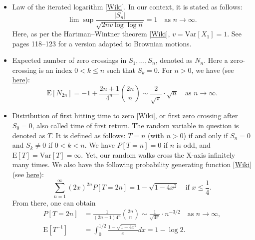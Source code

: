 \documentclass[oneside,10pt]{book}
\begin{document}
\begin{itemize}
\item \textcolor{index}{Law of the iterated logarithm} [\href{https://en.wikipedia.org/wiki/Law_of_the_iterated_logarithm}{Wiki}]. 
 In our context, it is stated as follows:
\begin{equation}
\lim \sup \frac{|S_n|}{\sqrt{2nv\log \log n}} = 1 \quad \text{as } n\rightarrow \infty.\label{lil12}
\end{equation}
Here, as per the 
 \textcolor{index}{Hartman–Wintner theorem} [\href{https://encyclopediaofmath.org/wiki/Law_of_the_iterated_logarithm}{Wiki}],  $v=\text{Var}[X_1]=1$. See~\cite{peresbrown} pages 118--123 for a version adapted to Brownian motions.
\item Expected number of \textcolor{index}{zero crossings} in $S_1,\dots,S_n$, denoted as $N_n$. Here a zero-crossing is an index $0<k\leq n$
 such that $S_k=0$. For $n>0$, we have (see \href{https://math.stackexchange.com/questions/1684576/expected-of-returns-in-a-symmetric-simple-random-walk}{here}): 
$$
\text{E}[N_{2n}]=-1+\frac{2n+1}{4^n} \binom{2n}{n}  \sim  \frac{2}{\sqrt{\pi}}\cdot \sqrt{n}  \quad \text{as } n\rightarrow \infty.
$$
\item Distribution of \textcolor{index}{first hitting time} to zero [\href{https://en.wikipedia.org/wiki/First-hitting-time_model}{Wiki}], or
 first zero crossing after $S_0=0$, also called time of first return. The random variable in question is denoted as $T$. It is defined as follows: 
$T=n$ (with $n>0$) if and only if $S_{n}=0$ and $S_k\neq 0$ if $0<k<n$. We have $P[T=n]=0$ if $n$ is odd, and $\text{E}[T]=\text{Var}[T]=\infty$. Yet, our random walks cross the X-axis infinitely many times.   We also have the following
 \textcolor{index}{probability generating function} [\href{https://en.wikipedia.org/wiki/Probability-generating_function}{Wiki}] (see \href{https://math.stackexchange.com/questions/64919/biased-random-walk-and-pdf-of-time-of-first-return}{here}):
$$
\sum_{n=1}^\infty  (2x)^{2n} P[T=2n] =1-\sqrt{1-4x^2} \quad \text{if } x\leq \frac{1}{4}.
$$
 From there, one can obtain 
\begin{align}
P[T=2n] & =\frac{1}{(2n-1)4^n}\binom{2n}{n}\sim \frac{1}{\sqrt{4\pi}}\cdot n^{-3/2} \quad \text{as } n\rightarrow \infty,\nonumber \\
\text{E}[T^{-1}] & = \int_{0}^{1/2} \frac{1-\sqrt{1-4x^2}}{x}dx = 1-\log 2. \nonumber
\end{align}
\end{itemize}
\end{document}
